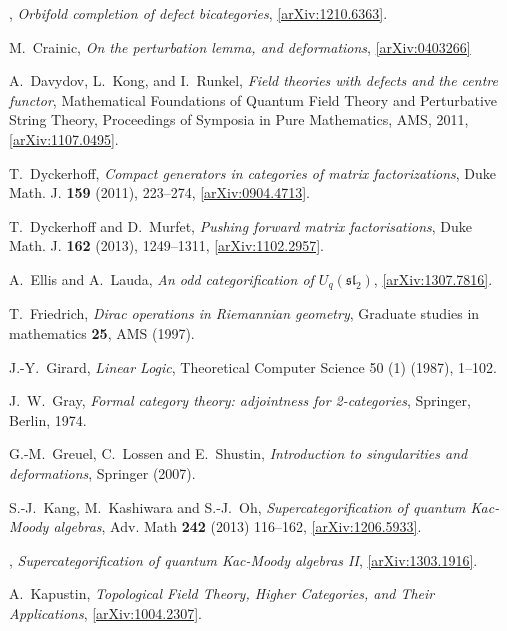 \documentclass[english,letter paper,12pt,leqno]{article}
\theoremstyle{example}
\numberwithin{equation}{section}
\begin{document}
\begin{thebibliography}{BHLS03}
\bysame, \textsl{Orbifold completion of defect bicategories}, 
\href{http://arxiv.org/abs/1210.6363}{[arXiv:1210.6363]}.

M.~Crainic, \emph{On the perturbation lemma, and deformations}, \href{http://arxiv.org/abs/math/0403266}{[arXiv:0403266]}

A.~Davydov, L.~Kong, and I.~Runkel, \textsl{Field theories with defects and the
  centre functor}, Mathematical Foundations of Quantum Field Theory and Perturbative String Theory, 
  Proceedings of Symposia in Pure Mathematics, AMS, 2011, \href{http://arxiv.org/abs/1107.0495}{[arXiv:1107.0495]}.
  
T.~Dyckerhoff, \textsl{Compact generators in categories of matrix factorizations},
  Duke Math. J. \textbf{159} (2011), 223--274,
  \href{http://arxiv.org/abs/0904.4713}{[arXiv:0904.4713]}.

T.~Dyckerhoff and D.~Murfet, \textsl{Pushing forward matrix factorisations}, Duke Math. J. \textbf{162} (2013), 1249--1311, \href{http://arxiv.org/abs/1102.2957}{[arXiv:1102.2957]}.

A.~Ellis and A.~Lauda, \textsl{An odd categorification of $U_q(\mathfrak{sl}_2)$}, \href{http://arxiv.org/abs/1307.7816}{[arXiv:1307.7816]}.

T.~Friedrich, \textsl{{D}irac operations in {R}iemannian geometry}, Graduate studies in mathematics \textbf{25}, AMS (1997).

J.-Y.~Girard, \textsl{Linear Logic}, Theoretical Computer Science 50 (1) (1987), 1--102.
  
J.~W.~Gray, \textsl{Formal category theory: adjointness for 2-categories}, Springer, Berlin, 1974.

G.-M.~Greuel, C.~Lossen and E.~Shustin, \textsl{Introduction to singularities and deformations}, Springer (2007).

S.-J.~Kang, M.~Kashiwara and S.-J.~Oh, \textsl{Supercategorification of quantum Kac-Moody algebras}, Adv. Math \textbf{242} (2013) 116--162, \href{http://arxiv.org/abs/1206.5933}{[arXiv:1206.5933]}.

\bysame, \textsl{Supercategorification of quantum Kac-Moody algebras II}, \href{http://arxiv.org/abs/1303.1916}{[arXiv:1303.1916]}.

A.~Kapustin, \textsl{Topological {F}ield {T}heory, {H}igher {C}ategories, and
  {T}heir {A}pplications},
  \href{http://arxiv.org/abs/1004.2307}{[arXiv:1004.2307]}.
  

\end{thebibliography}
\end{document}
